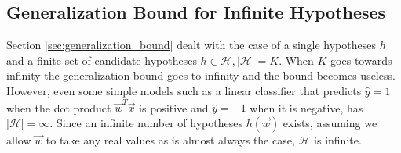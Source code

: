 \subsection{Generalization Bound for Infinite Hypotheses}
\label{subsec:generalization_bound_infinite}
Section \ref{sec:generalization_bound} dealt with the case of a single hypotheses $h$ and a finite set of candidate hypotheses $h\in\mathcal{H}, |\mathcal{H}| = K$. When $K$ goes towards infinity the generalization bound goes to infinity and the bound becomes useless. However, even some simple models such as a linear classifier that predicts $\hat{y}=1$ when the dot product $\vec{w}^T\vec{x}$ is positive and $\hat{y}=-1$ when it is negative, has $|\mathcal{H}| = \infty$. Since an infinite number of hypotheses $h(\vec{w})$ exists, assuming we allow $\vec{w}$ to take any real values as is almost always the case, $\mathcal{H}$ is infinite. 

